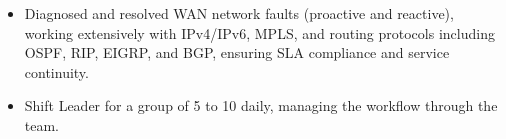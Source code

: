\vspace{0.4em}
\begin{itemize}[leftmargin=*]
\item Diagnosed and resolved WAN network faults (proactive and reactive), working extensively with IPv4/IPv6, MPLS, and routing protocols including OSPF, RIP, EIGRP, and BGP, ensuring SLA compliance and service continuity.

\vspace{0.2em}  
  
\item Shift Leader for a group of 5 to 10 daily, managing the workflow through the team. 
\end{itemize}
